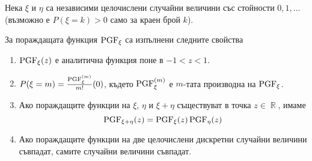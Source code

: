 \documentclass{../../common/topic}
\begin{document}
\begin{theorem}\label{thm:pgf_properties}
  Нека \( \xi \) и \( \eta \) са независими целочислени случайни величини със стойности \( 0, 1, \ldots \) (възможно е \( P(\xi = k) > 0 \) само за краен брой \( k \)).

  За пораждащата функция \( \operatorname{PGF}_\xi \) са изпълнени следните свойства
  \begin{enumerate}
    \item \( \operatorname{PGF}_\xi(z) \) е аналитична функция поне в \( -1 < z < 1 \).
    \item \( P(\xi = m) = \frac {\operatorname{PGF}_\xi^{(m)}} {m!} (0) \), където \( \operatorname{PGF}_\xi^{(m)} \) е \( m \)-тата производна на \( \operatorname{PGF}_\xi \).
    \item Ако пораждащите функции на \( \xi \), \( \eta \) и \( \xi + \eta \) съществуват в точка \( z \in \BbbR \), имаме
    \begin{equation*}
      \operatorname{PGF}_{\xi + \eta}(z) = \operatorname{PGF}_\xi(z) \operatorname{PGF}_\eta(z)
    \end{equation*}

    \item Ако пораждащите функции на две целочислени дискретни случайни величини съвпадат, самите случайни величини съвпадат.
  \end{enumerate}
\end{theorem}
\end{document}
